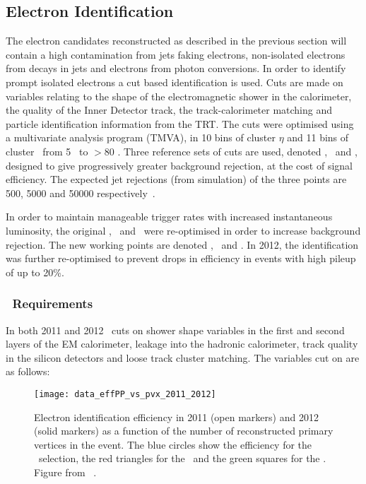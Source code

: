 \subsection{Electron Identification}
\label{sec:reco-el-id}

The electron candidates reconstructed as described in the previous section will
contain a high contamination from jets faking electrons, non-isolated electrons
from decays in jets and electrons from photon conversions. In order to identify
prompt isolated electrons a
cut based identification is used. Cuts are made on variables relating to the
shape of the electromagnetic shower in the calorimeter, the quality of the Inner Detector track, the
track-calorimeter matching and particle identification information from the
TRT. The cuts were optimised using a multivariate analysis program (TMVA), in 10 bins
of cluster $\eta$ and 11 bins of cluster \et\ from 5 \gev\ to $>80$ \gev.
Three reference sets of cuts are used, denoted \loose, \medium\ and \tight,
designed to give progressively greater background rejection, at the cost of
signal efficiency. The expected jet rejections (from simulation) of the three points are 500, 5000
and 50000 respectively~\cite{ATL-PHYS-PUB-2011-006}.

In order to maintain manageable trigger rates with increased instantaneous
luminosity, the original \loose, \medium\ and \tight\ were re-optimised in order
to increase background rejection. The new working points are denoted \loosePP,
\mediumPP\ and \tightPP. In 2012, the identification was further re-optimised to
prevent drops in efficiency in events with high pileup of up to 20\%. 

\subsubsection{\loosePP\ Requirements}

In both 2011 and 2012 \loosePP\ cuts on shower shape variables in the first and
second layers of the EM calorimeter, leakage into the hadronic
calorimeter, track quality in the silicon detectors and loose track cluster
matching. The variables cut on are as follows:

\begin{figure}[h]
\centering
            \texttt{[image: data\_effPP\_vs\_pvx\_2011\_2012]}
\caption[Electron identification efficiency in 2011 and 2012
 as a function of the number of reconstructed primary vertices in
the event.]{Electron identification efficiency in 2011 (open markers) and 2012
(solid markers) as a function of the number of reconstructed primary vertices in
the event. The blue circles show the efficiency for the \loosePP\ selection, the
red triangles for the \mediumPP\ and the green squares for the \tightPP. 
Figure
from
~\cite{EfficiencyPileup}.
}
\label{fig:el-id-showershapes-central}
\end{figure}

